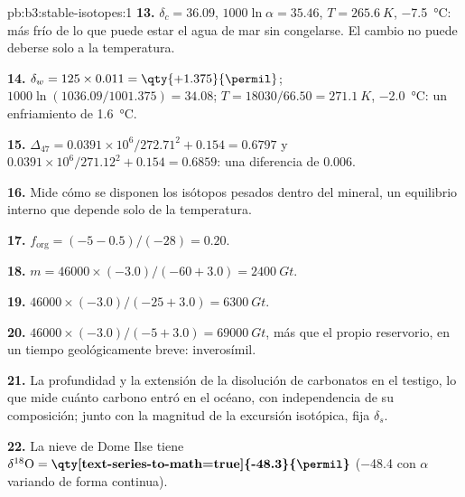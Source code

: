 \begin{solution}{pb:b3:stable-isotopes:1}
\textbf{13.} $\delta_c = 36.09$, $1000\ln\alpha = 35.46$, $T = \qty{265.6}{K}$,
\qty{-7.5}{\celsius}: más frío de lo que puede estar el agua de mar sin congelarse. El
cambio no puede deberse solo a la temperatura.

\textbf{14.} $\delta_w = 125\times0.011 = \qty{+1.375}{\permil}$; $1000\ln(1036.09/1001.375)
= 34.08$; $T = 18030/66.50 = \qty{271.1}{K}$, \qty{-2.0}{\celsius}: un enfriamiento de
\qty{1.6}{\celsius}.

\textbf{15.} $\Delta_{47} = 0.0391\times10^6/272.71^2 + 0.154 = 0.6797$ y
$0.0391\times10^6/271.12^2 + 0.154 = 0.6859$: una diferencia de
\qty{0.006}{\permil}.

\textbf{16.} Mide cómo se disponen los isótopos pesados dentro del
mineral, un equilibrio interno que depende solo de la temperatura.

\textbf{17.} $f_{\mathrm{org}} = (-5 - 0.5)/(-28) = 0.20$.

\textbf{18.} $m = 46000\times(-3.0)/(-60 + 3.0) = \qty{2400}{Gt}$.

\textbf{19.} $46000\times(-3.0)/(-25 + 3.0) = \qty{6300}{Gt}$.

\textbf{20.} $46000\times(-3.0)/(-5 + 3.0) = \qty{69000}{Gt}$, más que el
propio reservorio, en un tiempo geológicamente breve: inverosímil.

\textbf{21.} La profundidad y la extensión de la disolución de carbonatos en el testigo, lo que
mide cuánto carbono entró en el océano, con independencia de su composición;
junto con la magnitud de la excursión isotópica, fija $\delta_s$.

\textbf{22.} La nieve de Dome Ilse tiene $\delta^{18}\mathrm O =
\textbf{\qty[text-series-to-math=true]{-48.3}{\permil}} $ (\qty{-48.4}{\permil}
con $\alpha$ variando de forma continua).
\end{solution}
